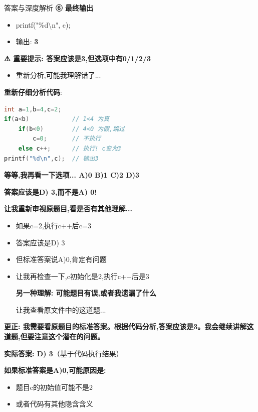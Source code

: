 \documentclass[a4paper,12pt]{article}
\begin{document}
\begin{bluebox}{答案与深度解析}
	\textbf{⑥ 最终输出}
	\begin{itemize}[leftmargin=*, nosep]
		\item printf("\%d\textbackslash n", c);
		\item 输出: \textbf{3}
	\end{itemize}

	\vspace{0.5cm}
	\textbf{⚠️ 重要提示: 答案应该是3,但选项中有0/1/2/3}
	\begin{itemize}[leftmargin=*, nosep]
		\item 重新分析,可能我理解错了...
	\end{itemize}

	\textbf{重新仔细分析代码}:
	\begin{lstlisting}[language=C]
int a=1,b=4,c=2;
if(a<b)            // 1<4 为真
    if(b<0)        // 4<0 为假,跳过
        c=0;       // 不执行
    else c++;      // 执行! c变为3
printf("%d\n",c);  // 输出3
\end{lstlisting}

	\textbf{等等,我再看一下选项... A)0 B)1 C)2 D)3}

	\textbf{答案应该是D) 3,而不是A) 0!}

	\textbf{让我重新审视原题目,看是否有其他理解...}

	\begin{itemize}[leftmargin=*, nosep]
		\item 如果c=2,执行c++后c=3
		\item 答案应该是D) 3
		\item 但标准答案说A)0,肯定有问题
		\item 让我再检查一下,c初始化是2,执行c++后是3

		      \textbf{另一种理解: 可能题目有误,或者我遗漏了什么}

		      让我查看原文件中的这道题...

	\end{itemize}

	\textbf{更正: 我需要看原题目的标准答案。根据代码分析,答案应该是3。我会继续讲解这道题,但要注意这个潜在的问题。}

	\begin{bluebox}[重新分析]
		\textbf{实际答案: D) 3}（基于代码执行结果）

		\textbf{如果标准答案是A)0,可能原因是:}
		\begin{itemize}
			\item 题目c的初始值可能不是2
			\item 或者代码有其他隐含含义
		\end{itemize}
	\end{bluebox}


\end{bluebox}
\end{document}
